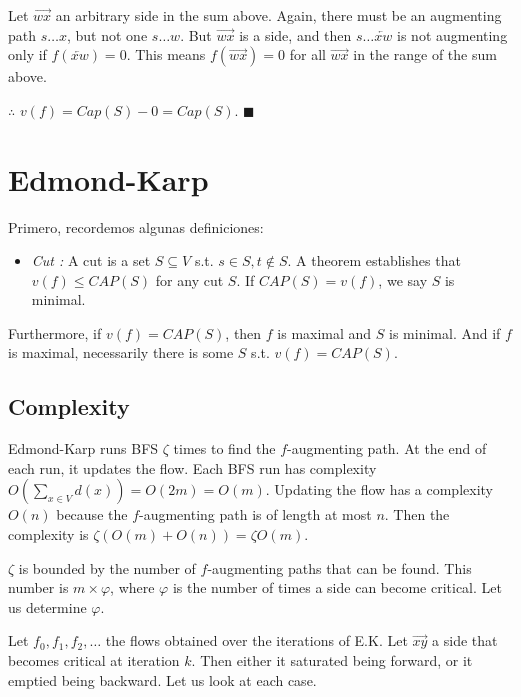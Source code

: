\documentclass[a4paper, 12pt]{article}
\begin{document}
Let $\overrightarrow{wx}$ an arbitrary side in the sum above. Again,
there must be an augmenting path $s \ldots x$, but not one 
$s \ldots w$. But $\overrightarrow{wx}$ is a side, and then 
$s \ldots \overleftarrow{xw}$ is not augmenting only if 
$f(\overleftarrow{xw}) = 0$. This means $f(\overrightarrow{wx}) = 0$
for all $\overrightarrow{wx}$ in the range of the sum above.

$\therefore $  $v(f) = Cap(S) - 0 = Cap(S)$. $\blacksquare$

\pagebreak

\section{Edmond-Karp}

Primero, recordemos algunas definiciones: 

\begin{itemize}
    \item \textit{Cut :} A cut is a set $S \subseteq V$ s.t. $s \in S, t
        \not\in S$. A theorem establishes that $v(f) \leq CAP(S)$ for any cut
        $S$. If $CAP(S) = v(f)$, we say $S$ is minimal. 
\end{itemize}

Furthermore, if $v(f) = CAP(S)$, then $f$ is maximal and $S$ is minimal. And if $f$ is maximal,
necessarily there is some $S$ s.t. $v(f) = CAP(S)$.

\subsection{Complexity}

Edmond-Karp runs BFS $\zeta$ times to find the $f$-augmenting path. At the end
of each run, it updates the flow. Each BFS run has complexity $O(\sum_{x \in V}
d(x)) = O(2m) = O(m)$. Updating the flow has a complexity $O(n)$ because the
$f$-augmenting path is of length at most $n$. Then the complexity is $\zeta
\left( O(m) + O(n) \right) = \zeta O(m)$. 

$\zeta$ is bounded by the number of $f$-augmenting paths that can be found.
This number is $m \times \varphi$, where $\varphi$ is the number of times a
side can become critical. Let us determine $\varphi$.


Let $f_0, f_1, f_2, \ldots$ the flows obtained over the iterations of E.K. Let
$\overrightarrow{xy}$ a side that becomes critical at iteration $k$. Then
either it saturated being forward, or it emptied being backward. Let us look at
each case.
\end{document}
